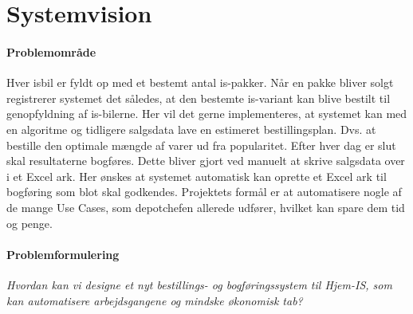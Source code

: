 \chapter{Systemvision}\label{ch:systemvision}

\subsubsection{Problemområde}

Hver isbil er fyldt op med et bestemt antal is-pakker. Når en pakke bliver solgt registrerer systemet det således, at den bestemte is-variant kan blive bestilt til genopfyldning af is-bilerne. Her vil det gerne implementeres, at systemet kan med en algoritme og tidligere salgsdata lave en estimeret bestillingsplan. Dvs. at bestille den optimale mængde af varer ud fra popularitet. 
Efter hver dag er slut skal resultaterne bogføres. Dette bliver gjort ved manuelt at skrive salgsdata over i et Excel ark. Her ønskes at systemet automatisk kan oprette et Excel ark til bogføring som blot skal godkendes.
Projektets formål er at automatisere nogle af de mange Use Cases, som depotchefen allerede udfører, hvilket kan spare dem tid og penge.

\subsubsection{Problemformulering}
 \textit{Hvordan kan vi designe et nyt bestillings- og bogføringssystem til Hjem-IS, som kan automatisere arbejdsgangene og mindske økonomisk tab?}